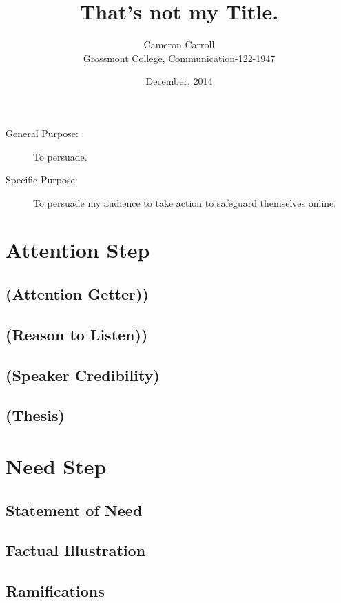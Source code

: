 \documentclass{article}
\title{That's not my Title.}
\date{December, 2014}
\author{Cameron Carroll\\ Grossmont College, Communication-122-1947}
\begin{document}
  \maketitle
  \section*{}
    \begin{description}
      \item[General Purpose:] To persuade.
      \item[Specific Purpose:] To persuade my audience to take action to safeguard themselves online.
    \end{description}

  \section{Attention Step}
    \subsection{(Attention Getter))}
    \subsection{(Reason to Listen))}
    \subsection{(Speaker Credibility)}
    \subsection{(Thesis)}

  \section{Need Step}
    \subsection{Statement of Need}
    \subsection{Factual Illustration}
    \subsection{Ramifications}
\end{document}
